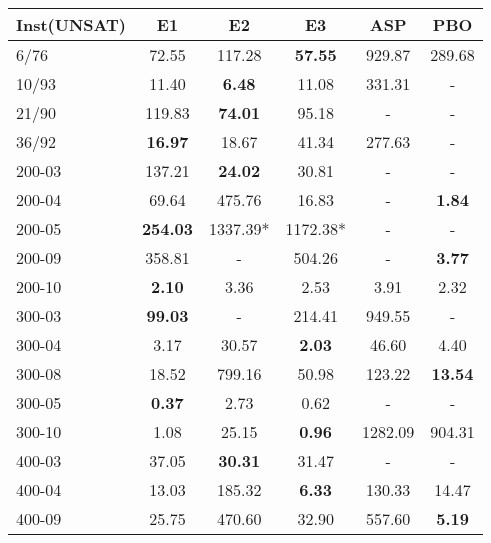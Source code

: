 \begin{tabular}{ l|ccccc }
Inst(UNSAT) &E1 &E2 &E3 &ASP    &PBO\\
    \hline
6/76   &72.55  &117.28 &{\bf 57.55}  &929.87 &289.68\\
10/93  &11.40  &{\bf 6.48}   &11.08  &331.31 &-\\
21/90  &119.83 &{\bf 74.01}  &95.18  &-  &-\\
36/92  &{\bf 16.97}  &18.67  &41.34  &277.63 &-\\
200-03 &137.21 &{\bf 24.02}  &30.81  &-  &-\\
200-04 &69.64  &475.76 &16.83  &-  &{\bf 1.84}\\
200-05 &{\bf 254.03} &1337.39*   &1172.38*   &-  &-\\
200-09 &358.81 &-  &504.26 &-  &{\bf 3.77}\\
200-10 &{\bf 2.10}   &3.36   &2.53   &3.91   &2.32\\
300-03 &{\bf 99.03}  &-  &214.41 &949.55 &-\\
300-04 &3.17   &30.57  &{\bf 2.03 }  &46.60  &4.40\\
300-08 &18.52  &799.16 &50.98  &123.22 &{\bf 13.54}\\
300-05 &{\bf 0.37}   &2.73   &0.62   &-  &-\\
300-10 &1.08   &25.15  &{\bf 0.96}   &1282.09    &904.31\\
400-03 &37.05  &{\bf 30.31}  &31.47  &-  &-\\
400-04 &13.03  &185.32 &{\bf 6.33 }  &130.33 &14.47\\
400-09 &25.75  &470.60 &32.90  &557.60 &{\bf 5.19}\\
    \hline
\end{tabular}
